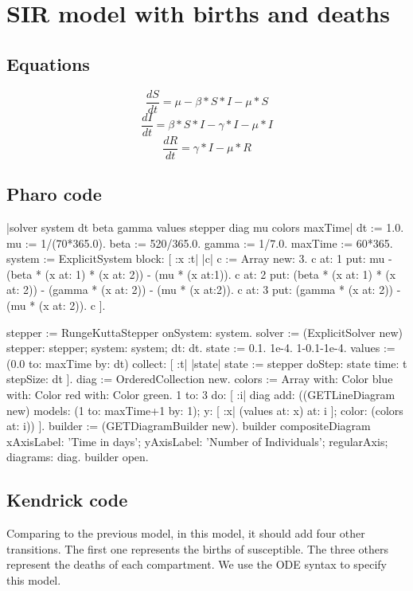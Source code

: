 \documentclass[a4paper,10pt,twoside]{book}
\begin{document}
\section{ SIR model with births and deaths}\subsection{ Equations}

\begin{equation}
\frac{dS}{dt} = \mu-\beta*S*I-\mu*S
\end{equation}
\begin{equation}
\frac{dI}{dt} = \beta*S*I-\gamma*I-\mu*I
\end{equation}
\begin{equation}
\frac{dR}{dt} = \gamma*I-\mu*R
\end{equation}
\subsection{ Pharo code}

\begin{code}{}
|solver system dt beta gamma values stepper diag mu colors maxTime|
dt := 1.0.
mu := 1/(70*365.0).
beta := 520/365.0.
gamma := 1/7.0.
maxTime := 60*365.
system := ExplicitSystem block: [ :x :t| |c|
     c := Array new: 3.
     c at: 1 put: mu - (beta  * (x at: 1) * (x at: 2)) - (mu * (x at:1)).
     c at: 2 put: (beta * (x at: 1) * (x at: 2)) - (gamma * (x at: 2)) - (mu * (x at:2)).
     c at: 3 put: (gamma * (x at: 2)) - (mu * (x at: 2)).
     c
     ].

stepper := RungeKuttaStepper onSystem: system.
solver := (ExplicitSolver new) stepper: stepper; system: system; dt: dt.
state := { 0.1. 1e-4. 1-0.1-1e-4}.
values := (0.0 to: maxTime by: dt) collect: [ :t| |state| state := stepper doStep: state
                                                          time: t stepSize: dt ].
diag := OrderedCollection new.
colors := Array with: Color blue with: Color red with: Color green.
1 to: 3 do: [ :i|
    diag add:
        ((GETLineDiagram new)
            models: (1 to: maxTime+1 by: 1);
            y: [ :x| (values at: x) at: i ];
            color: (colors at: i))
     ].
builder := (GETDiagramBuilder new).
builder compositeDiagram
    xAxisLabel: 'Time in days';
    yAxisLabel: 'Number of Individuals';
    regularAxis;
    diagrams: diag.
builder open.
\end{code}

\subsection{Kendrick code}
Comparing to the previous model, in this model, it should add four other transitions. The first one represents the births of susceptible.
The three others represent the deaths of each compartment.
We use the ODE syntax to specify this model.
\end{document}
